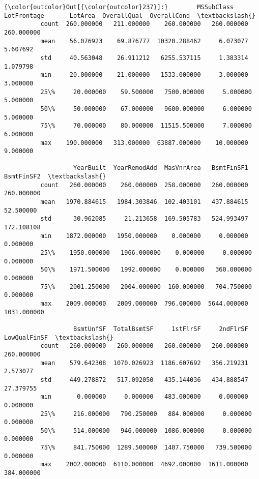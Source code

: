 \documentclass[11pt]{article}
\begin{document}
\begin{Verbatim}[commandchars=\\\{\}]
{\color{outcolor}Out[{\color{outcolor}237}]:}        MSSubClass  LotFrontage       LotArea  OverallQual  OverallCond  \textbackslash{}
          count  260.000000   211.000000    260.000000   260.000000   260.000000   
          mean    56.076923    69.876777  10320.288462     6.073077     5.607692   
          std     40.563048    26.911212   6255.537115     1.383314     1.079798   
          min     20.000000    21.000000   1533.000000     3.000000     3.000000   
          25\%     20.000000    59.500000   7500.000000     5.000000     5.000000   
          50\%     50.000000    67.000000   9600.000000     6.000000     5.000000   
          75\%     70.000000    80.000000  11515.500000     7.000000     6.000000   
          max    190.000000   313.000000  63887.000000    10.000000     9.000000   
          
                   YearBuilt  YearRemodAdd  MasVnrArea   BsmtFinSF1   BsmtFinSF2  \textbackslash{}
          count   260.000000    260.000000  258.000000   260.000000   260.000000   
          mean   1970.884615   1984.303846  102.403101   437.884615    52.500000   
          std      30.962085     21.213658  169.505783   524.993497   172.108108   
          min    1872.000000   1950.000000    0.000000     0.000000     0.000000   
          25\%    1950.000000   1966.000000    0.000000     0.000000     0.000000   
          50\%    1971.500000   1992.000000    0.000000   360.000000     0.000000   
          75\%    2001.250000   2004.000000  160.000000   704.750000     0.000000   
          max    2009.000000   2009.000000  796.000000  5644.000000  1031.000000   
          
                   BsmtUnfSF  TotalBsmtSF     1stFlrSF     2ndFlrSF  LowQualFinSF  \textbackslash{}
          count   260.000000   260.000000   260.000000   260.000000    260.000000   
          mean    579.642308  1070.026923  1186.607692   356.219231      2.573077   
          std     449.278872   517.092050   435.144036   434.888547     27.379755   
          min       0.000000     0.000000   483.000000     0.000000      0.000000   
          25\%     216.000000   790.250000   884.000000     0.000000      0.000000   
          50\%     514.000000   946.000000  1086.000000     0.000000      0.000000   
          75\%     841.750000  1289.500000  1407.750000   739.500000      0.000000   
          max    2002.000000  6110.000000  4692.000000  1611.000000    384.000000   
          

\end{Verbatim}
\end{document}
